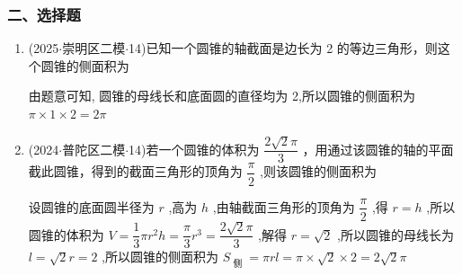 \subsubsection*{二、选择题}
\begin{enumerate}
    \item (2025$\cdot$崇明区二模$\cdot$14)已知一个圆锥的轴截面是边长为 2 的等边三角形，则这个圆锥的侧面积为 
    \begin{jieda}
        由题意可知, 圆锥的母线长和底面圆的直径均为 2,所以圆锥的侧面积为 $\pi  \times  1 \times  2 = {2\pi }$
    \end{jieda}

    \item (2024$\cdot$普陀区二模$\cdot$14)若一个圆锥的体积为 $\dfrac{2\sqrt{2}\pi }{3}$ ，用通过该圆锥的轴的平面截此圆锥，得到的截面三角形的顶角为 $\dfrac{\pi }{2}$ ,则该圆锥的侧面积为 
    \begin{jieda}
        设圆锥的底面圆半径为 $r$ ,高为 $h$ ,由轴截面三角形的顶角为 $\dfrac{\pi }{2}$ ,得 $r = h$ ,所以圆锥的体积为 $V = \dfrac{1}{3}\pi {r}^{2}h = \dfrac{\pi }{3}{r}^{3} =  \dfrac{2\sqrt{2}\pi }{3}$ ,解得 $r = \sqrt{2}$ ,所以圆锥的母线长为 $l = \sqrt{2}r = 2$ ,所以圆锥的侧面积为 ${S}_{\text{ 侧 }} = {\pi rl} = \pi  \times  \sqrt{2} \times  2 = 2\sqrt{2}\pi$
    \end{jieda}


\end{enumerate}
